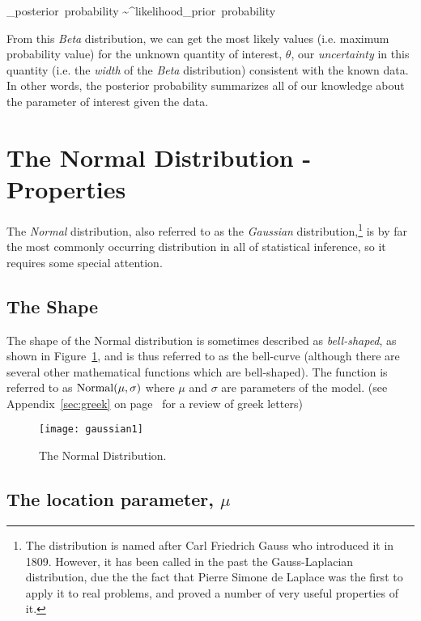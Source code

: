 \beqn
{}_{\rm posterior\ probability} \sim {}^{\rm likelihood}\times {}_{\rm prior\ probability}
\eeqn

From this {\em Beta} distribution, we can get the most likely values (i.e. maximum probability value) for the unknown quantity of interest, $\theta$, our {\em uncertainty} in this quantity (i.e. the {\em width} of the {\em Beta} distribution) consistent with the known data.  In other words, the posterior probability summarizes all of our knowledge about the parameter of interest given the data.


\section{The Normal Distribution - Properties}\label{sec:normaldist}

The {\em Normal} distribution, also referred to as the {\em Gaussian} distribution,\footnote{The distribution is named after  Carl Friedrich Gauss who introduced it in 1809. However, it has been called in the past the Gauss-Laplacian distribution, due the the fact that Pierre Simone de Laplace was the first to apply it to real problems, and proved a number of very useful properties of it.} is by far the most commonly occurring distribution in all of statistical inference, so it requires some special attention.

\subsection{The Shape}

The shape of the Normal distribution is sometimes described as {\em bell-shaped}, as shown in Figure~\ref{fig:bell}, and is thus referred to as the bell-curve (although there are several other mathematical functions which are bell-shaped).  The function is referred to as ${\rm Normal}(\mu,\sigma)$ where $\mu$ and $\sigma$ are parameters of the model. (see Appendix~\ref{sec:greek} on page~\pageref{sec:greek} for a review of greek letters)

\begin{figure}
\texttt{[image: gaussian1]}
\caption{The Normal Distribution.}
\label{fig:bell}
\end{figure}

\subsection{The location parameter, $\mu$}

